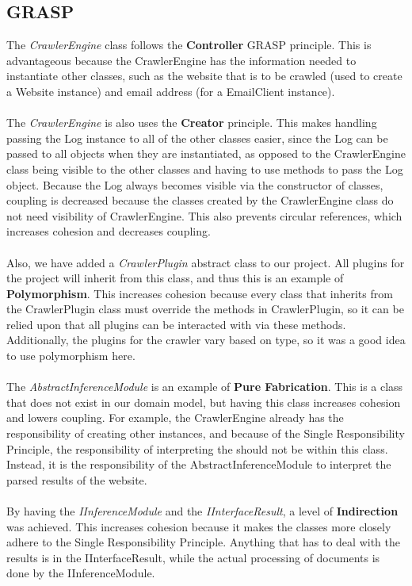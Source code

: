 \documentclass{article}
\begin{document}
\subsection{GRASP}
The \emph{CrawlerEngine} class follows the \textbf{Controller} GRASP principle. This is advantageous because the CrawlerEngine has the information needed to instantiate other classes, such as the website that is to be crawled (used to create a Website instance) and email address (for a EmailClient instance).\\\\%
The \emph{CrawlerEngine} is also uses the \textbf{Creator} principle. This makes handling passing the Log instance to all of the other classes easier, since the Log can be passed to all objects when they are instantiated, as opposed to the CrawlerEngine class being visible to the other classes and having to use methods to pass the Log object. Because the Log always becomes visible via the constructor of classes, coupling is decreased because the classes created by the CrawlerEngine class do not need visibility of CrawlerEngine. This also prevents circular references, which increases cohesion and decreases coupling.\\\\
Also, we have added a \emph{CrawlerPlugin} abstract class to our project. All plugins for the project will inherit from this class, and thus this is an example of \textbf{Polymorphism}. This increases cohesion because every class that inherits from the CrawlerPlugin class must override the methods in CrawlerPlugin, so it can be relied upon that all plugins can be interacted with via these methods. Additionally, the plugins for the crawler vary based on type, so it was a good idea to use polymorphism here.\\\\
The \emph{AbstractInferenceModule} is an example of \textbf{Pure Fabrication}. This is a class that does not exist in our domain model, but having this class increases cohesion and lowers coupling. For example, the CrawlerEngine already has the responsibility of creating other instances, and because of the Single Responsibility Principle, the responsibility of interpreting the should not be within this class. Instead, it is the responsibility of the AbstractInferenceModule to interpret the parsed results of the website.\\\\
By having the \emph{IInferenceModule} and the \emph{IInterfaceResult}, a level of \textbf{Indirection} was achieved. This increases cohesion because it makes the classes more closely adhere to the Single Responsibility Principle. Anything that has to deal with the results is in the IInterfaceResult, while the actual processing of documents is done by the IInferenceModule.\\\\
\end{document}
